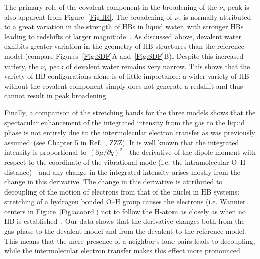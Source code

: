 \documentclass[journal=jacsat,manuscript=article]{achemso}
\begin{document}
The primary role of the covalent component in the broadening of the $\nu_s$ peak is also apparent from Figure~\ref{Fig:IR}. 
The broadening of $\nu_s$ is normally attributed to a great variation in the strength of HBs in liquid water, with stronger HBs leading to redshifts of larger magnitude~\cite{ZZZ}. 
As discussed above, devalent water exhibits greater variation in the geometry of HB structures than the reference model (compare Figures~\ref{Fig:SDF}A and~\ref{Fig:SDF}B). 
Despite this increased variety, the $\nu_s$ peak of devalent water remains very narrow. This shows that the variety of HB configurations alone is of little importance: a wider variety of HB without the covalent component simply does not generate a redshift and thus cannot result in peak broadening. 


Finally, a comparison of the stretching bands for the three models shows that the spectacular enhancement of the integrated intensity from the gas to the liquid phase is not entirely due to the intermolecular electron transfer as was previously assumed~(see Chapter 5 in Ref.~, ZZZ). 
It is well known that the integrated intensity is proportional to $\left({\partial \mu}/{\partial q}\right)^2$---the derivative of the dipole moment with respect to the coordinate of the vibrational mode (i.e. the intramolecular O--H distance)---and any change in the integrated intensity arises mostly from the change in this derivative. 
The change in this derivative is attributed to decoupling of the motion of electrons from that of the nuclei in HB systems: stretching of a hydrogen bonded O--H group causes the electrons (i.e. Wannier centers in Figure~\ref{Fig:acoord}) not to follow the H-atom as closely as when no HB is established~\cite{marechal2006hydrogen}. 
Our data shows that the derivative changes both from the gas-phase to the devalent model and from the devalent to the reference model. 
This means that the mere presence of a neighbor's lone pairs leads to decoupling, while the intermolecular electron transfer makes this effect more pronounced.

\end{document}
